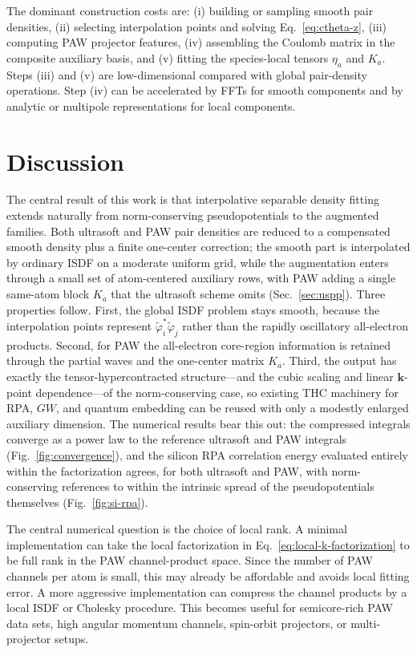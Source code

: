 \documentclass[aps,prb,reprint,superscriptaddress,longbibliography,nofootinbib]{revtex4-2}
\newcommand{\bk}{\mathbf k}
\begin{document}
The dominant construction costs are: (i) building or sampling smooth pair densities, (ii) selecting interpolation points and solving Eq.~\eqref{eq:ctheta-z}, (iii) computing PAW projector features, (iv) assembling the Coulomb matrix in the composite auxiliary basis, and (v) fitting the species-local tensors \(\eta_a\) and \(K_a\).  Steps (iii) and (v) are low-dimensional compared with global pair-density operations.  Step (iv) can be accelerated by FFTs for smooth components and by analytic or multipole representations for local components.

\section{Discussion}
\label{sec:discussion}

The central result of this work is that interpolative separable density fitting extends naturally from norm-conserving pseudopotentials to the augmented families.  Both ultrasoft and PAW pair densities are reduced to a compensated smooth density plus a finite one-center correction; the smooth part is interpolated by ordinary ISDF on a moderate uniform grid, while the augmentation enters through a small set of atom-centered auxiliary rows, with PAW adding a single same-atom block \(K_a\) that the ultrasoft scheme omits (Sec.~\ref{sec:uspp}).  Three properties follow.  First, the global ISDF problem stays smooth, because the interpolation points represent \(\widetilde\varphi_i^*\widetilde\varphi_j\) rather than the rapidly oscillatory all-electron products.  Second, for PAW the all-electron core-region information is retained through the partial waves and the one-center matrix \(K_a\).  Third, the output has exactly the tensor-hypercontracted structure---and the cubic scaling and linear \(\bk\)-point dependence---of the norm-conserving case, so existing THC machinery for RPA, \(GW\), and quantum embedding can be reused with only a modestly enlarged auxiliary dimension.  The numerical results bear this out: the compressed integrals converge as a power law to the reference ultrasoft and PAW integrals (Fig.~\ref{fig:convergence}), and the silicon RPA correlation energy evaluated entirely within the factorization agrees, for both ultrasoft and PAW, with norm-conserving references to within the intrinsic spread of the pseudopotentials themselves (Fig.~\ref{fig:si-rpa}).

The central numerical question is the choice of local rank.  A minimal implementation can take the local factorization in Eq.~\eqref{eq:local-k-factorization} to be full rank in the PAW channel-product space.  Since the number of PAW channels per atom is small, this may already be affordable and avoids local fitting error.  A more aggressive implementation can compress the channel products by a local ISDF or Cholesky procedure.  This becomes useful for semicore-rich PAW data sets, high angular momentum channels, spin-orbit projectors, or multi-projector setups.
\end{document}
